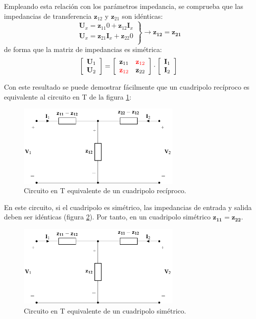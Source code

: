 Empleando esta relación con los parámetros impedancia, se comprueba que las impedancias de transferencia $\mathbf{z}_{12}$ y $\mathbf{z}_{21}$ son idénticas:
\[
  \left.
    \begin{array}{l}
      \mathbf{U}_x = \mathbf{z}_{11} 0  + \mathbf{z}_{12} \mathbf{I}_x\\
      \mathbf{U}_x = \mathbf{z}_{21} \mathbf{I}_x + \mathbf{z}_{22} 0\\
    \end{array} \right\} \rightarrow \mathbf{z_{12}} = \mathbf{z_{21}}
\]
de forma que la matriz de impedancias es simétrica:
\[
\left[
    \begin{array}{c}
      \mathbf{U}_1\\
      \mathbf{U}_2
    \end{array}
  \right] =
  \left[
    \begin{array}{cc}
      \mathbf{z}_{11} & \color{red}{\mathbf{z}_{12}}\\
      \color{red}{\mathbf{z}_{12}} & \mathbf{z}_{22}
    \end{array}
  \right] \cdot
  \left[
    \begin{array}{c}
      \mathbf{I}_1\\
      \mathbf{I}_2
    \end{array}
  \right]
\]

Con este resultado se puede demostrar fácilmente que un cuadripolo recíproco es equivalente al circuito en T de la figura \ref{fig:impedancia-equivalente-recíproco}:

\begin{figure}[H]
  \centering
  \includegraphics[height=4cm]{../figs/circuitoEquivalenteZReciproco.pdf}
  \caption{Circuito en T equivalente de un cuadripolo recíproco.}
  \label{fig:impedancia-equivalente-recíproco}
\end{figure}

En este circuito, si el cuadripolo es simétrico, las impedancias de entrada y salida deben ser idénticas (figura \ref{fig:impedancia-equivalente-simétrico}). Por tanto, en un cuadripolo simétrico $\mathbf{z_{11}} = \mathbf{z_{22}}$.
\begin{figure}[H]
  \centering
  \includegraphics[height=4cm]{../figs/circuitoEquivalenteZSimetrico.pdf}
  \caption{Circuito en T equivalente de un cuadripolo simétrico.}
  \label{fig:impedancia-equivalente-simétrico}
\end{figure}

